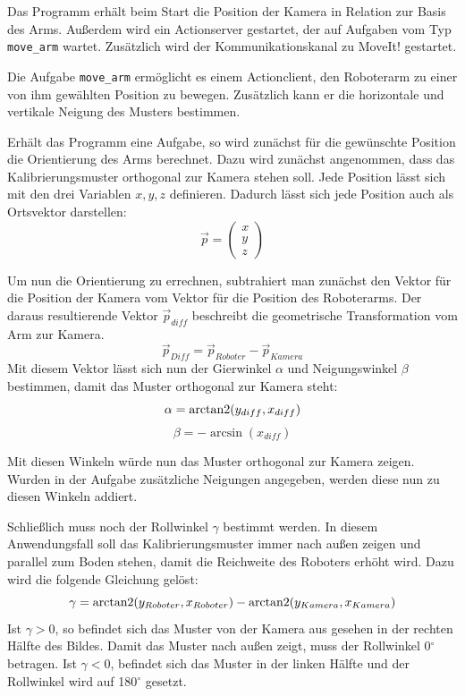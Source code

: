 Das Programm erhält beim Start die Position der Kamera in Relation zur Basis des Arms. Außerdem wird ein Actionserver gestartet, der auf Aufgaben vom Typ \texttt{move\_arm} wartet. Zusätzlich wird der Kommunikationskanal zu MoveIt! gestartet.

Die Aufgabe \texttt{move\_arm} ermöglicht es einem Actionclient, den Roboterarm zu einer von ihm gewählten Position zu bewegen. Zusätzlich kann er die horizontale und vertikale Neigung des Musters bestimmen.

Erhält das Programm eine Aufgabe, so wird zunächst für die gewünschte Position die Orientierung des Arms berechnet. Dazu wird zunächst angenommen, dass das Kalibrierungsmuster orthogonal zur Kamera stehen soll. Jede Position lässt sich mit den drei Variablen $x, y, z$ definieren. Dadurch lässt sich jede Position auch als Ortsvektor darstellen:
\begin{equation}
	\vec{p} = 
	\begin{pmatrix}
		x\\
		y\\
		z
	\end{pmatrix}
\end{equation}

Um nun die Orientierung zu errechnen, subtrahiert man zunächst den Vektor für die Position der Kamera vom Vektor für die Position des Roboterarms. Der daraus resultierende Vektor $\vec{p}_{diff}$ beschreibt die geometrische Transformation vom Arm zur Kamera. 
\begin{equation}\label{eq:diff}
	\vec{p}_{Diff} = \vec{p}_{Roboter} - \vec{p}_{Kamera}
\end{equation}
Mit diesem Vektor lässt sich nun der Gierwinkel $\alpha$ und Neigungswinkel $\beta$ bestimmen, damit das Muster orthogonal zur Kamera steht:
\begin{equation}\label{eq:pitch}
	\alpha = \operatorname{arctan2}(y_{diff}, x_{diff})
\end{equation}
\begin{equation}\label{eq:yaw}
	\beta = -\arcsin(x_{diff})
\end{equation}

Mit diesen Winkeln würde nun das Muster orthogonal zur Kamera zeigen. Wurden in der Aufgabe zusätzliche Neigungen angegeben, werden diese nun zu diesen Winkeln addiert.

Schließlich muss noch der Rollwinkel $\gamma$ bestimmt werden. In diesem Anwendungsfall soll das Kalibrierungsmuster immer nach außen zeigen und parallel zum Boden stehen, damit die Reichweite des Roboters erhöht wird. Dazu wird die folgende Gleichung gelöst:
\begin{equation}
	\gamma = \operatorname{arctan2}(y_{Roboter}, x_{Roboter}) - \operatorname{arctan2}(y_{Kamera}, x_{Kamera})
\end{equation}
Ist $\gamma > 0$, so befindet sich das Muster von der Kamera aus gesehen in der rechten Hälfte des Bildes. Damit das Muster nach außen zeigt, muss der Rollwinkel 0$^\circ$ betragen. Ist $\gamma < 0$, befindet sich das Muster in der linken Hälfte und der Rollwinkel wird auf 180$^\circ$ gesetzt.

